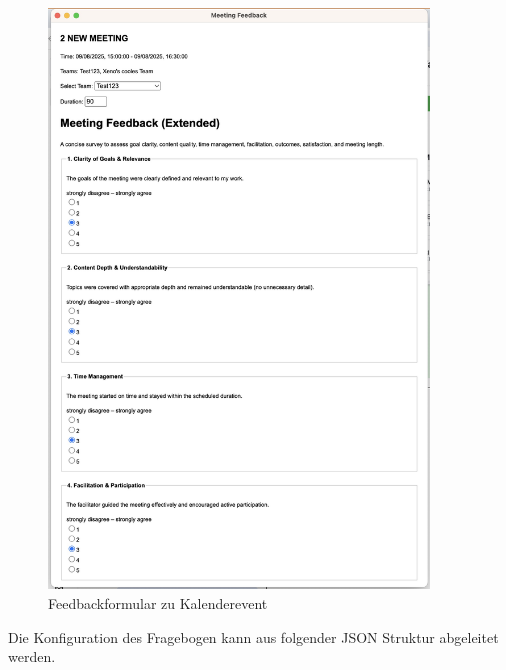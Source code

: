 \documentclass[12pt,a4paper]{report}
\begin{document}
        \begin{figure}[H]
          \centering
          \includegraphics[width=0.90\textwidth]{../figures/yappi-chrome-extension/yappi-extension-feedback.jpg}
          \caption{Feedbackformular zu Kalenderevent}
          \label{fig:yappi-extension-feedback}
        \end{figure}

        Die Konfiguration des Fragebogen kann aus folgender JSON Struktur abgeleitet werden.
\end{document}
